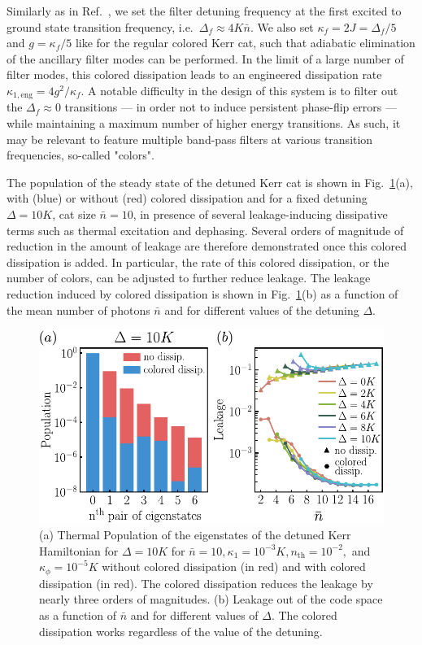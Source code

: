 \documentclass[%
 reprint,
 superscriptaddress,
 amsmath,
 amssymb,
 aps,
 pra,
 10pt
]{revtex4-2}
\newcommand{\ie}{i.e.}
\newcommand{\nbar}{\bar{n}}
\begin{document}
Similarly as in Ref.~\cite{Putterman2022}, we set the filter detuning frequency at the first excited to ground state transition frequency, \ie~$\Delta_f \approx 4K \bar{n}$. We also set $\kappa_f = 2J = \Delta_f / 5$ and $g = \kappa_f / 5$ like for the regular colored Kerr cat, such that adiabatic elimination of the ancillary filter modes can be performed. In the limit of a large number of filter modes, this colored dissipation leads to an engineered dissipation rate $\kappa_{1,\textrm{eng}}=4g^2/\kappa_f$. A notable difficulty in the design of this system is to filter out the $\Delta_f \approx 0$ transitions --- in order not to induce persistent phase-flip errors --- while maintaining a maximum number of higher energy transitions. As such, it may be relevant to feature multiple band-pass filters at various transition frequencies, so-called "colors".

The population of the steady state of the detuned Kerr cat is shown in Fig.~\ref{fig:coloredthermalstate}(a), with (blue) or without (red) colored dissipation and for a fixed detuning $\Delta = 10K$, cat size $\nbar = 10$, in presence of several leakage-inducing dissipative terms such as thermal excitation and dephasing. Several orders of magnitude of reduction in the amount of leakage are therefore demonstrated once this colored dissipation is added. In particular, the rate of this colored dissipation, or the number of colors, can be adjusted to further reduce leakage. The leakage reduction induced by colored dissipation is shown in Fig.~\ref{fig:coloredthermalstate}(b) as a function of the mean number of photons $\bar{n}$ and for different values of the detuning $\Delta$.

\begin{figure}[t!]
    \includegraphics[width=\columnwidth]{image/Color_Thermal_State_V2.pdf}
    \caption{\label{fig:coloredthermalstate}
    (a) Thermal Population of the eigenstates of the detuned Kerr Hamiltonian for $\Delta = 10K$ for $\nbar = 10,\kappa_1 = 10^{-3}K, n_{\text{th}}=10^{-2},$ and $\kappa_\phi = 10^{-5}K$ without colored dissipation (in red) and with colored dissipation (in red). The colored dissipation reduces the leakage by nearly three orders of magnitudes. (b) Leakage out of the code space as a function of $\nbar$ and for different values of $\Delta$. The colored dissipation works regardless of the value of the detuning.
    }
\end{figure}
\end{document}
